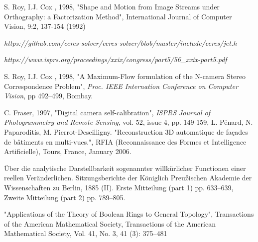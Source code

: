 \begin{thebibliography}{AAA}
      S. Roy, I.J. Cox , 1998, "Shape and Motion from Image 
            Streams under Orthography: a Factorization Method", International Journal of Computer Vision, 
            9:2, 137-154 (1992)


     \emph{https://github.com/ceres-solver/ceres-solver/blob/master/include/ceres/jet.h}

     \emph{https://www.isprs.org/proceedings/xxix/congress/part5/56\_xxix-part5.pdf}

      S. Roy, I.J. Cox , 1998, "A Maximum-Flow
            formulation of the N-camera Stereo Correspondence
      Problem", \emph{Proc. IEEE Internation Conference on
      Computer Vision}, pp 492--499, Bombay.

     C. Fraser, 1997, "Digital camera self-calibration",
   \emph{ISPRS Journal of Photogrammetry and Remote Sensing}, vol. 52, issue 4, pp. 149-159,
      L. Pénard, N. Paparoditis, M. Pierrot-Deseilligny.
           "Reconstruction 3D automatique de façades de bâtiments en multi-vues.",
            RFIA (Reconnaissance des Formes et Intelligence Artificielle),
            Tours, France, January 2006.

     Über die analytische Darstellbarkeit sogenannter willkürlicher Functionen
           einer reellen Veränderlichen. Sitzungsberichte der Königlich Preußischen Akademie der Wissenschaften zu Berlin,
           1885 (II).  Erste Mitteilung (part 1) pp. 633–639, Zweite Mitteilung (part 2) pp. 789–805.

     "Applications of the Theory of Boolean Rings to General Topology",
          Transactions of the American Mathematical Society, Transactions of the American Mathematical Society,
          Vol. 41, No. 3, 41 (3): 375–481

\end{thebibliography}


\printindex








